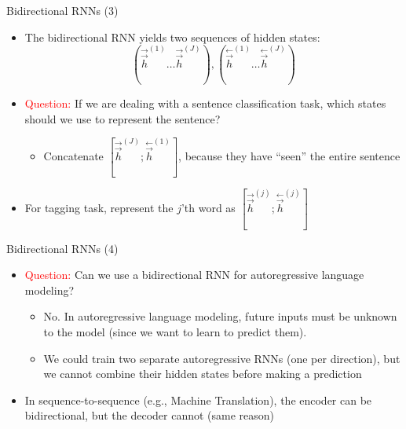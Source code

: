 \documentclass[11pt,compress,t,notes=noshow, xcolor=table]{beamer}
\begin{document}

\begin{vbframe}{Bidirectional RNNs (3)}

\vfill

\begin{itemize}
	\item The bidirectional RNN yields two sequences of hidden states:
	$$(\overset{\rightarrow}{\vec h}^{(1)} \ldots \overset{\rightarrow}{\vec h}^{(J)}), (\overset{\leftarrow}{\vec h}^{(1)} \ldots \overset{\leftarrow}{\vec h}^{(J)})$$
	\item \textcolor{red}{Question:} If we are dealing with a sentence classification task, which states should we use to represent the sentence?
		\begin{itemize}
			\item Concatenate $[\overset{\rightarrow}{\vec h}^{(J)};\overset{\leftarrow}{\vec h}^{(1)}]$, because they have ``seen'' the entire sentence
		\end{itemize}
	\item For tagging task, represent the $j$'th word as $[\overset{\rightarrow}{\vec h}^{(j)};\overset{\leftarrow}{\vec h}^{(j)}]$
\end{itemize}

\vfill

\end{vbframe}


\begin{vbframe}{Bidirectional RNNs (4)}

\vfill

\begin{itemize}
	\item \textcolor{red}{Question:} Can we use a bidirectional RNN for autoregressive language modeling?
		\begin{itemize}
			\item No. In autoregressive language modeling, future inputs must be unknown to the model (since we want to learn to predict them).
			\item We could train two separate autoregressive RNNs (one per direction), but we cannot combine their hidden states before making a prediction
		\end{itemize}
	\item In sequence-to-sequence (e.g., Machine Translation), the encoder can be bidirectional, but the decoder cannot (same reason)
\end{itemize}

\vfill

\end{vbframe}


\endlecture
\end{document}
